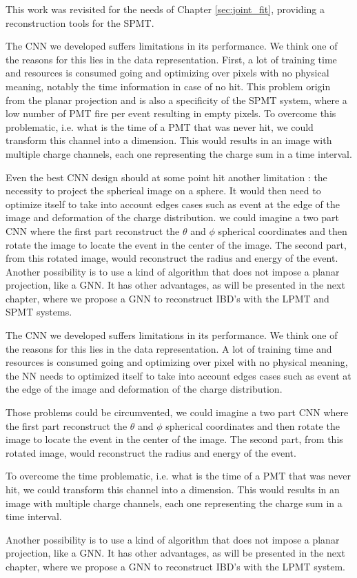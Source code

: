 \documentclass[../main.tex]{subfiles}
\begin{document}
This work was revisited for the needs of Chapter \ref{sec:joint_fit}, providing a reconstruction tools for the SPMT.

The CNN we developed suffers limitations in its performance. We think one of the reasons for this lies in the data representation. First, a lot of training time and resources is consumed going and optimizing over pixels with no physical meaning, notably the time information in case of no hit. This problem origin from the planar projection and is also a specificity of the SPMT system, where a low number of PMT fire per event resulting in empty pixels. To overcome this problematic, i.e. what is the time of a PMT that was never hit, we could transform this channel into a dimension. This would results in an image with multiple charge channels, each one representing the charge sum in a time interval.

Even the best CNN design should at some point hit another limitation : the necessity to project the spherical image on a sphere. It would then need to optimize itself to take into account edges cases such as event at the edge of the image and deformation of the charge distribution. we could imagine a two part CNN where the first part reconstruct the $\theta$ and $\phi$ spherical coordinates and then rotate the image to locate the event in the center of the image. The second part, from this rotated image, would reconstruct the radius and energy of the event. Another possibility is to use a kind of algorithm that does not impose a planar projection, like a GNN. It has other advantages, as will be presented in the next chapter, where we propose a GNN to reconstruct IBD's with the LPMT and SPMT systems.

The CNN we developed suffers limitations in its performance. We think one of the  reasons for this lies in  the data representation. A lot of training time and resources is consumed going and optimizing over pixel with no physical meaning, the NN needs to optimized itself to take into account edges cases such as event at the edge of the image and deformation of the charge distribution.

Those problems could be circumvented, we could imagine a two part CNN where the first part reconstruct the $\theta$ and $\phi$ spherical coordinates and then rotate the image to locate the event in the center of the image. The second part, from this rotated image, would reconstruct the radius and energy of the event.

To overcome the time problematic, i.e. what is the time of a PMT that was never hit, we could transform this channel into a dimension. This would results in an image with multiple charge channels, each one representing the charge sum in a time interval.

Another possibility is to use  a kind of algorithm that does not impose a planar projection, like a GNN. It has other advantages, as will be presented in the next chapter, where we propose a GNN to reconstruct IBD's with the LPMT system.
\end{document}
